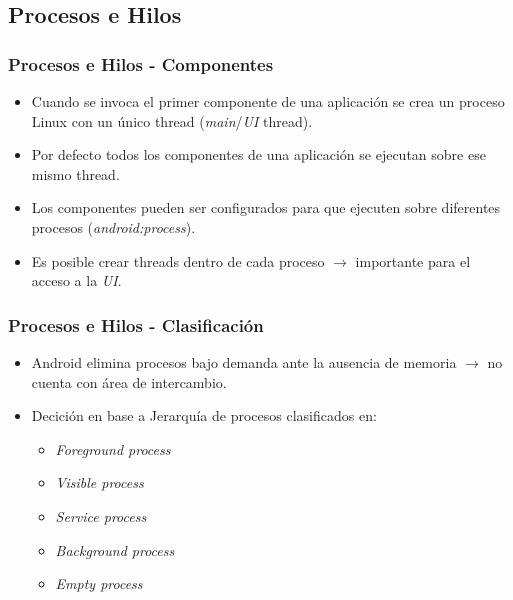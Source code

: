 \subsection{Procesos e Hilos}
\begin{frame}
  \frametitle{Procesos e Hilos - Componentes}
  \begin{itemize}
    \item Cuando se invoca el primer componente de una aplicación se crea un proceso Linux con un único thread (\textit{main}/\textit{UI} thread).
    
    \item Por defecto todos los componentes de una aplicación se ejecutan sobre ese mismo thread.
    
    \item Los componentes pueden ser configurados para que ejecuten sobre diferentes procesos (\textit{android:process}).
    
    \item Es posible crear threads dentro de cada proceso $\rightarrow$ importante para el acceso a la \textit{UI}.
  \end{itemize}
\end{frame}

\begin{frame}
  \frametitle{Procesos e Hilos - Clasificación}
  \begin{itemize}
    \item Android elimina procesos bajo demanda ante la ausencia de memoria $\rightarrow$ no cuenta con área de intercambio.
    
    \item Decición en base a Jerarquía de procesos clasificados en:
    \begin{itemize}
     \item \textit{Foreground process}
     \item \textit{Visible process}
     \item \textit{Service process}
     \item \textit{Background process}
     \item \textit{Empty process}
    \end{itemize}       
  \end{itemize}
\end{frame}

